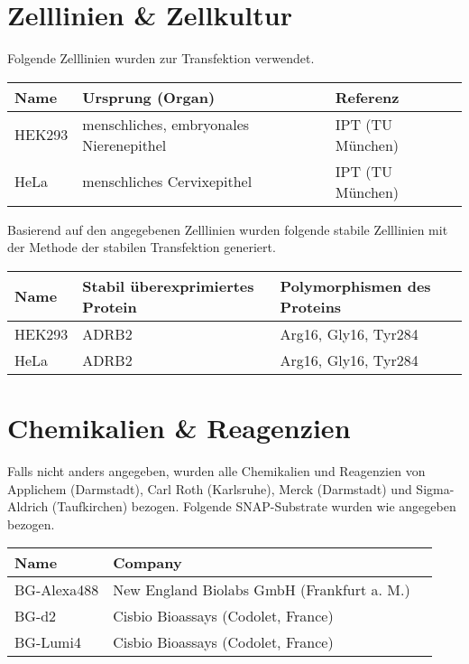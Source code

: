 \section{Zelllinien \& Zellkultur}
Folgende Zelllinien wurden zur Transfektion verwendet.

\begin{table}[htsp]
	\begin{tabular}{lll}
\toprule
Name		&	Ursprung (Organ)				&	Referenz\\
\midrule
HEK293		&	menschliches, embryonales Nierenepithel		&	IPT (TU München)\\
HeLa		&	menschliches Cervixepithel		&	IPT (TU München)\\
\bottomrule
\end {tabular}
\end{table}

Basierend auf den angegebenen Zelllinien wurden folgende stabile Zelllinien mit der Methode der stabilen Transfektion generiert.

\begin{table}[htsb]
\begin{tabularx}{\textwidth}{lll}
\toprule
Name		&	Stabil überexprimiertes Protein	&	Polymorphismen des Proteins\\
\midrule
HEK293		&	ADRB2		&	Arg16, Gly16, Tyr284\\
HeLa		&	ADRB2		&	Arg16, Gly16, Tyr284\\
\bottomrule
\end{tabularx}
\end{table}

\section{Chemikalien \& Reagenzien}
Falls nicht anders angegeben, wurden alle Chemikalien und Reagenzien von Applichem (Darmstadt), Carl Roth (Karlsruhe), Merck (Darmstadt) und Sigma-Aldrich (Taufkirchen) bezogen. Folgende SNAP-Substrate wurden wie angegeben bezogen.

\begin{table}[htsb]
\begin{tabular}{lll}
\toprule
Name							&	Company\\
\midrule
BG-Alexa488						&	New England Biolabs GmbH (Frankfurt a. M.)\\
BG-d2							&	Cisbio Bioassays (Codolet, France)\\
BG-Lumi4						&	Cisbio Bioassays (Codolet, France)\\
\bottomrule
\end {tabular}
\end{table}

